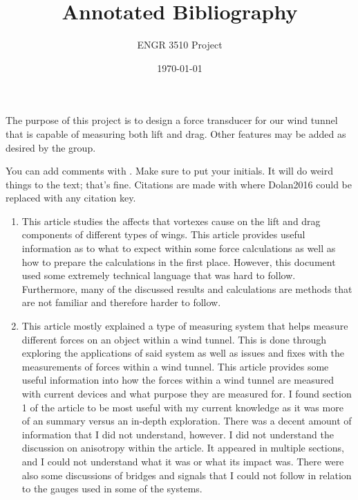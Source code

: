 \documentclass[12pt,letterpaper]{article}
\begin{document}
\title{Annotated Bibliography}
\author{ENGR 3510 Project}
\date{\today}
\maketitle

The purpose of this project is to design a force transducer for our wind tunnel that is capable of measuring both lift and drag. Other features may be added as desired by the group.

You can add comments with . Make sure to put your initials. It will do weird things to the text; that's fine. 
Citations are made with \cite{Dolan2016} where Dolan2016 could be replaced with any citation key. 



\begin{enumerate}
	\item \cite{Gerontakos2007} This article studies the affects that vortexes cause on the lift and drag components of different types of wings. This article provides useful information as to what to expect within some force calculations as well as how to prepare the calculations in the first place. However, this document used some extremely technical language that was hard to follow. Furthermore, many of the discussed results and calculations are methods that are not familiar and therefore harder to follow.
	\item \cite{Portman2009} This article mostly explained a type of measuring system that helps measure different forces on an object within a wind tunnel. This is done through exploring the applications of said system as well as issues and fixes with the measurements of forces within a wind tunnel. This article provides some useful information into how the forces within a wind tunnel are measured with current devices and what purpose they are measured for. I found section 1 of the article to be most useful with my current knowledge as it was more of an summary versus an in-depth exploration. There was a decent amount of information that I did not understand, however. I did not understand the discussion on anisotropy within the article. It appeared in multiple sections, and I could not understand what it was or what its impact was. There were also some discussions of bridges and signals that I could not follow in relation to the gauges used in some of the systems.
\end{enumerate}

\printbibliography
\end{document}
